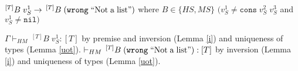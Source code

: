 \begin{case}
$^{[T]}B\;v_{S}^{1}\rightarrow\,^{[T]}B\;(\mathtt{wrong}\;\mathrm{``Not\;a\;list"})$ where $B\in\lbrace HS,MS\rbrace$ $(v_{S}^{1}\neq\mathtt{cons}\;v_{S}^{2}\;v_{S}^{3}$ and $v_{S}^{1}\neq\mathtt{nil})$

$\Gamma\vdash_{HM}\,^{[T]}B\;v_{S}^{1}:[T]$ by premise and inversion (Lemma \ref{i}) and uniqueness of types (Lemma \ref{uot}).  $\vdash_{HM}\,^{[T]}B\;(\mathtt{wrong}\;\mathrm{``Not\;a\;list"}):[T]$ by inversion (Lemma \ref{i}) and uniqueness of types (Lemma \ref{uot}).
\end{case}